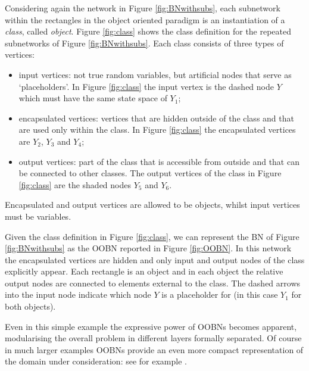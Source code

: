 Considering again the network in Figure \ref{fig:BNwithsubs}, each subnetwork within the rectangles in the object oriented paradigm is an instantiation of  a \textit{class}, called \textit{object}. Figure \ref{fig:class} shows the class definition for the repeated subnetworks of Figure \ref{fig:BNwithsubs}. Each class consists of three types of vertices:
\begin{itemize}
\item input vertices: not true random variables, but artificial nodes that serve as \lq{p}laceholders\rq{.} In Figure \ref{fig:class} the input vertex is the dashed node $Y$ which must have the same state space of $Y_1$;
\item encapsulated vertices: vertices that are hidden outside of the class and that are used only within the class. In Figure \ref{fig:class} the encapsulated vertices are $Y_2$, $Y_3$ and $Y_4$;
\item output vertices: part of the class that is accessible from outside and that can be connected to other classes. The output vertices of the class in Figure \ref{fig:class} are the shaded nodes $Y_5$ and $Y_6$. 
\end{itemize}
Encapsulated and output vertices are allowed to be objects, whilst input vertices must be variables. 

Given the class definition in Figure \ref{fig:class}, we can represent the BN of Figure \ref{fig:BNwithsubs} as the OOBN reported in Figure \ref{fig:OOBN}.  In this network the encapsulated vertices are hidden and only input and output nodes of the class explicitly appear. Each rectangle is an object and in each object the relative output nodes are connected to elements external to the class. The dashed arrows into the input node indicate which node $Y$ is a placeholder for (in this case $Y_1$ for both objects).

Even in this simple example the expressive power of OOBNs becomes apparent, modularising the overall problem in different layers formally separated. Of course in much larger examples OOBNs provide an even more compact representation of the domain under consideration: see for example \citet{Neil2000}.

